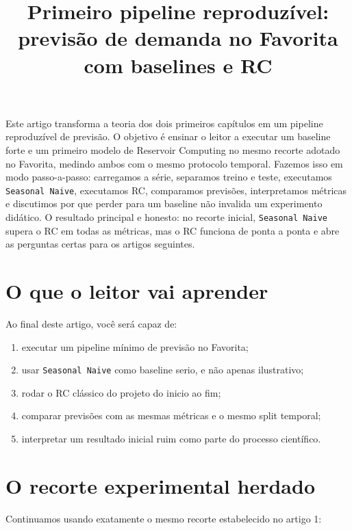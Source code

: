 \documentclass[12pt]{article}
\title{Primeiro pipeline reproduzível: previsão de demanda no Favorita com baselines e RC}
\author{}
\providecommand{\tightlist}{%
          \setlength{\itemsep}{0pt}\setlength{\parskip}{0pt}}
\begin{document}
        \maketitle

        \begin{resumo}
        Este artigo transforma a teoria dos dois primeiros capítulos em um pipeline reproduzível de previsão. O objetivo é ensinar o leitor a executar um baseline forte e um primeiro modelo de Reservoir Computing no mesmo recorte adotado no Favorita, medindo ambos com o mesmo protocolo temporal. Fazemos isso em modo passo-a-passo: carregamos a série, separamos treino e teste, executamos \texttt{Seasonal\ Naive}, executamos RC, comparamos previsões, interpretamos métricas e discutimos por que perder para um baseline não invalida um experimento didático. O resultado principal e honesto: no recorte inicial, \texttt{Seasonal\ Naive} supera o RC em todas as métricas, mas o RC funciona de ponta a ponta e abre as perguntas certas para os artigos seguintes.
        \end{resumo}

        \section{O que o leitor vai aprender}\label{1-o-que-o-leitor-vai-aprender}

Ao final deste artigo, você será capaz de:

\begin{enumerate}
\def\labelenumi{\arabic{enumi}.}
\tightlist
\item
  executar um pipeline mínimo de previsão no Favorita;
\item
  usar \texttt{Seasonal\ Naive} como baseline serio, e não apenas ilustrativo;
\item
  rodar o RC clássico do projeto do inicio ao fim;
\item
  comparar previsões com as mesmas métricas e o mesmo split temporal;
\item
  interpretar um resultado inicial ruim como parte do processo científico.
\end{enumerate}

\section{O recorte experimental herdado}\label{2-o-recorte-experimental-herdado}

Continuamos usando exatamente o mesmo recorte estabelecido no artigo 1:
\end{document}
